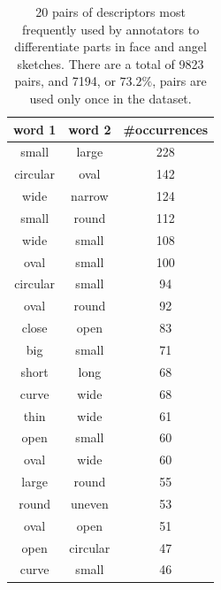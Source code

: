 \begin{table}[htb!]
\begin{minipage}{1\textwidth}
\begin{center}
{\small
\begin{tabular}{ccc}
\toprule
word 1 & word 2 & \#occurrences \\
\midrule 
small & large & 228 \\
circular & oval & 142 \\
wide & narrow & 124 \\
small & round & 112 \\
wide & small & 108 \\
oval & small & 100 \\
circular & small & 94 \\
oval & round & 92 \\
close & open & 83 \\
big & small & 71 \\
short & long & 68 \\
curve & wide & 68 \\
thin & wide & 61 \\
open & small & 60 \\
oval & wide & 60 \\
large & round & 55 \\
round & uneven & 53 \\
oval & open & 51 \\
open & circular & 47 \\
curve & small & 46 \\
\bottomrule
\end{tabular}}
\caption{20 pairs of descriptors most frequently used by annotators to differentiate parts in face and angel sketches. There are a total of 9823 pairs, and 7194, or $73.2\%$, pairs are used only once in the dataset.}
\label{results.clip.top20.sim}
\end{center}
\end{minipage} 
\end{table}

